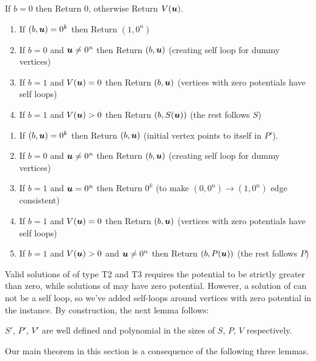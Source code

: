 \medskip
\medskip

 If $b=0$ then Return $0$, otherwise Return $V(\mbox{\boldmath $u$})$. 
\medskip
\medskip

\vspace{-0.3cm}

\begin{enumerate}
\item If $(b,\mbox{\boldmath $u$})=0^k$ then Return $(1,0^n)$
\item If $b=0$ and $\mbox{\boldmath $u$}\neq 0^n$ then Return $(b,\mbox{\boldmath $u$})$ (creating self loop for dummy vertices)
\item If $b=1$ and $V(\mbox{\boldmath $u$})=0$ then Return $(b,\mbox{\boldmath $u$})$ (vertices with zero potentials have self loops)
\item If $b=1$ and $V(\mbox{\boldmath $u$})>0$ then Return $(b,S(\mbox{\boldmath $u$}))$ (the rest follows $S$)
\end{enumerate}

\vspace{-0.3cm}

\begin{enumerate}
\item If $(b,\mbox{\boldmath $u$})=0^k$ then Return $(b,\mbox{\boldmath $u$})$ (initial vertex points to itself in $P'$).
\item If $b=0$ and $\mbox{\boldmath $u$}\neq 0^n$ then Return $(b,\mbox{\boldmath $u$})$ (creating self loop for dummy vertices)
\item If $b=1$ and $\mbox{\boldmath $u$}=0^n$ then Return $0^k$ (to make $(0,0^n)\rightarrow (1,0^n)$ edge consistent)
\item If $b=1$ and $V(\mbox{\boldmath $u$})=0$ then Return $(b,\mbox{\boldmath $u$})$ (vertices with zero potentials have self loops)
\item If $b=1$ and $V(\mbox{\boldmath $u$})>0$ and $\mbox{\boldmath $u$} \neq 0^n$ then Return $(b,P(\mbox{\boldmath $u$}))$ (the rest follows $P$)
\end{enumerate}

Valid solutions of \EOML of type T2 and T3 requires the potential to be strictly greater than zero, while solutions of \EOPL may have zero potential. However, a solution of \EOPL can not be a self loop, so we've added self-loops around vertices with zero potential in the \EOPL instance.
By construction, the next lemma follows:
\begin{lemma}\label{lem:m2p-valid}
$S'$, $P'$, $V'$ are well defined and polynomial in the sizes of $S$, $P$, $V$ respectively. 
\end{lemma}

Our main theorem in this section is a consequence of the following three lemmas.

